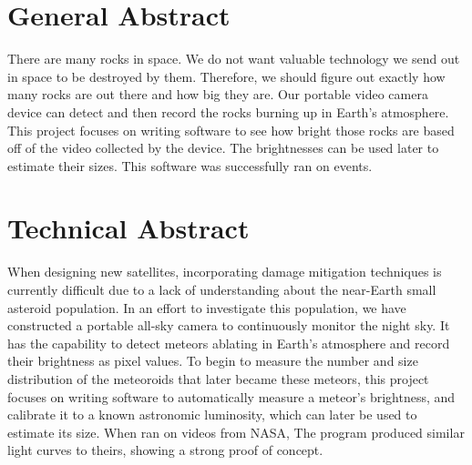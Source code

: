 \section*{General Abstract}
There are many rocks in space. We do not want valuable technology we send out in space to be destroyed by them. Therefore, we should figure out exactly how many rocks are out there and how big they are. Our portable video camera device can detect and then record the rocks burning up in Earth's atmosphere. This project focuses on writing software to see how bright those rocks are based off of the video collected by the device. The brightnesses can be used later to estimate their sizes. This software was successfully ran on events.

\section*{Technical Abstract}
When designing new satellites, incorporating damage mitigation techniques is currently difficult due to a lack of understanding about the near-Earth small asteroid population. In an effort to investigate this population, we have constructed a portable all-sky camera to continuously monitor the night sky. It has the capability to detect meteors ablating in Earth's atmosphere and record their brightness as pixel values. To begin to measure the number and size distribution of the meteoroids that later became these meteors, this project focuses on writing software to automatically measure a meteor's brightness, and  calibrate it to a known astronomic luminosity, which can later be used to estimate its size. When ran on videos from NASA, The program produced similar light curves to theirs, showing a strong proof of concept.
